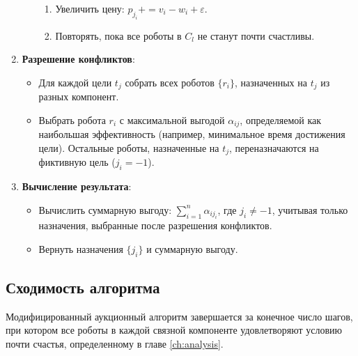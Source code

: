 \begin{enumerate}
\begin{itemize}
\begin{enumerate}
            \item Увеличить цену: \( p_{j_i} += v_i - w_i + \varepsilon \).
            \item Повторять, пока все роботы в \( C_l \) не станут почти счастливы.
        \end{enumerate}
    \end{itemize}
    \item \textbf{Разрешение конфликтов}:
    \begin{itemize}
        \item Для каждой цели \( t_j \) собрать всех роботов \( \{r_i\} \), назначенных на \( t_j \) из разных компонент.
        \item Выбрать робота \( r_i \) с максимальной выгодой \( \alpha_{ij} \), определяемой как наибольшая эффективность (например, минимальное время достижения цели). Остальные роботы, назначенные на \( t_j \), переназначаются на фиктивную цель (\( j_i = -1 \)).
    \end{itemize}
    \item \textbf{Вычисление результата}:
    \begin{itemize}
        \item Вычислить суммарную выгоду: \( \sum_{i=1}^n \alpha_{i j_i} \), где \( j_i \neq -1 \), учитывая только назначения, выбранные после разрешения конфликтов.
        \item Вернуть назначения \( \{j_i\} \) и суммарную выгоду.
    \end{itemize}
\end{enumerate}

\subsection{Сходимость алгоритма}

\begin{theorem}
\label{thm:mod_auction_convergence}
Модифицированный аукционный алгоритм завершается за конечное число шагов, при котором все роботы в каждой связной компоненте удовлетворяют условию почти счастья, определенному в главе \ref{ch:analysis}.
\end{theorem}

